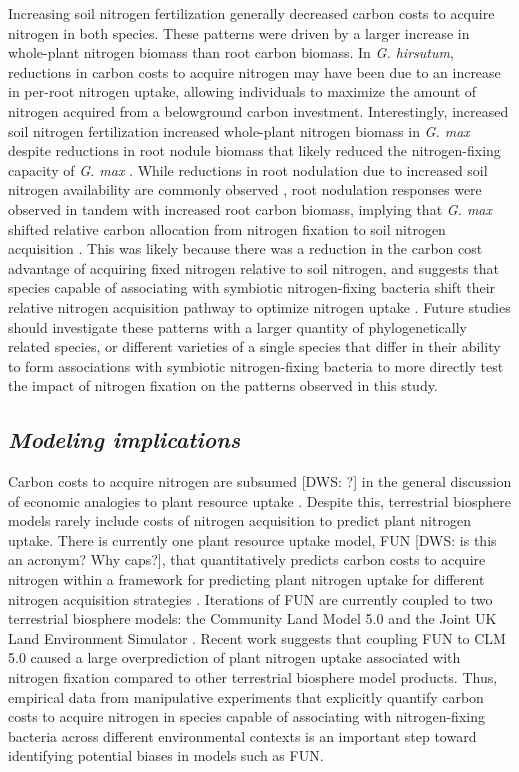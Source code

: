 Increasing soil nitrogen fertilization generally decreased carbon costs to acquire nitrogen in both species. These patterns were driven by a larger increase in whole-plant nitrogen biomass than root carbon biomass. In \textit{G. hirsutum}, reductions in carbon costs to acquire nitrogen may have been due to an increase in per-root nitrogen uptake, allowing individuals to maximize the amount of nitrogen acquired from a belowground carbon investment. Interestingly, increased soil nitrogen fertilization increased whole-plant nitrogen biomass in \textit{G. max} despite reductions in root nodule biomass that likely reduced the nitrogen-fixing capacity of \textit{G. max} . While reductions in root nodulation due to increased soil nitrogen availability are commonly observed , root nodulation responses were observed in tandem with increased root carbon biomass, implying that \textit{G. max} shifted relative carbon allocation from nitrogen fixation to soil nitrogen acquisition . This was likely because there was a reduction in the carbon cost advantage of acquiring fixed nitrogen relative to soil nitrogen, and suggests that species capable of associating with symbiotic nitrogen-fixing bacteria shift their relative nitrogen acquisition pathway to optimize nitrogen uptake . Future studies should investigate these patterns with a larger quantity of phylogenetically related species, or different varieties of a single species that differ in their ability to form associations with symbiotic nitrogen-fixing bacteria to more directly test the impact of nitrogen fixation on the patterns observed in this study.

\subsection{\textit{Modeling implications}}
\noindent Carbon costs to acquire nitrogen are subsumed [DWS: ?] in the general discussion of economic analogies to plant resource uptake . Despite this, terrestrial biosphere models rarely include costs of nitrogen acquisition to predict plant nitrogen uptake. There is currently one plant resource uptake model, FUN [DWS: is this an acronym? Why caps?], that quantitatively predicts carbon costs to acquire nitrogen within a framework for predicting plant nitrogen uptake for different nitrogen acquisition strategies . Iterations of FUN are currently coupled to two terrestrial biosphere models: the Community Land Model 5.0 and the Joint UK Land Environment Simulator . Recent work suggests that coupling FUN to CLM 5.0 caused a large overprediction of plant nitrogen uptake associated with nitrogen fixation  compared to other terrestrial biosphere model products. Thus, empirical data from manipulative experiments that explicitly quantify carbon costs to acquire nitrogen in species capable of associating with nitrogen-fixing bacteria across different environmental contexts is an important step toward identifying potential biases in models such as FUN.

